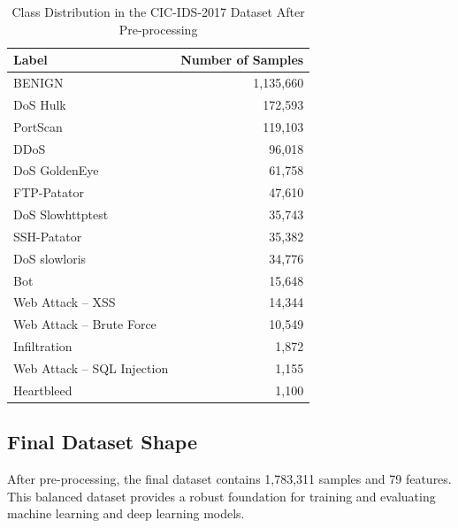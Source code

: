 \documentclass[conference]{IEEEtran}
\begin{document}
\begin{table}[ht]
\centering
\caption{Class Distribution in the CIC-IDS-2017 Dataset After Pre-processing}
\label{tab:class_distribution_after}
\begin{tabular}{|l|r|}
\hline
\textbf{Label}                     & \textbf{Number of Samples} \\ \hline
BENIGN                             & 1,135,660                 \\ \hline
DoS Hulk                           & 172,593                   \\ \hline
PortScan                           & 119,103                   \\ \hline
DDoS                               & 96,018                    \\ \hline
DoS GoldenEye                      & 61,758                    \\ \hline
FTP-Patator                        & 47,610                    \\ \hline
DoS Slowhttptest                   & 35,743                    \\ \hline
SSH-Patator                        & 35,382                    \\ \hline
DoS slowloris                      & 34,776                    \\ \hline
Bot                                & 15,648                    \\ \hline
Web Attack – XSS                   & 14,344                    \\ \hline
Web Attack – Brute Force           & 10,549                    \\ \hline
Infiltration                       & 1,872                     \\ \hline
Web Attack – SQL Injection         & 1,155                     \\ \hline
Heartbleed                         & 1,100                     \\ \hline
\end{tabular}
\end{table}

\subsection{Final Dataset Shape}
After pre-processing, the final dataset contains 1,783,311 samples and 79 features. This balanced dataset provides a robust foundation for training and evaluating machine learning and deep learning models.
\end{document}
